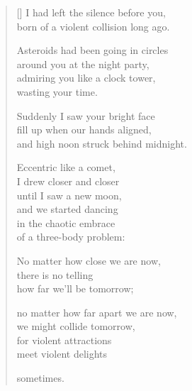 \documentclass[12pt,a4paper]{article}
\begin{document}
\thispagestyle{empty}


\settowidth{\versewidth}{born of a violent collision long ago.}

\bigskip

\begin{verse}[\versewidth]
I had left the silence before you, \\
born of a violent collision long ago.

Asteroids had been going in circles \\
around you at the night party, \\
admiring you like a clock tower, \\
wasting your time.

Suddenly I saw your bright face \\
fill up when our hands aligned, \\
and high noon struck behind midnight.

Eccentric like a comet, \\
I drew closer and closer \\
until I saw a new moon, \\
and we started dancing \\
in the chaotic embrace \\
of a three-body problem:

No matter how close we are now, \\
there is no telling \\
how far we'll be tomorrow;

no matter how far apart we are now, \\
we might collide tomorrow, \\
for violent attractions \\
meet violent delights

sometimes.
\end{verse}
\end{document}
